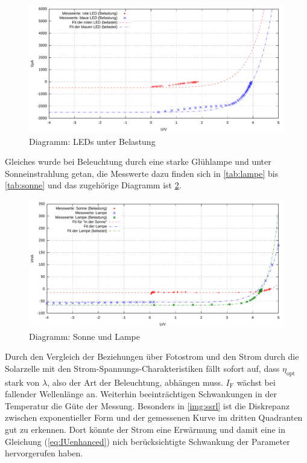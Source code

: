 \documentclass[numbers=noenddot,12pt,a4paper]{scrartcl}
\newcommand{\ix}[1]{_\text{#1}}
\begin{document}
\begin{figure}[H]
	\includegraphics[width=1\textwidth]{messwerte/stromspannungspannungsrichtigbelastungled.pdf}
	\vspace{-2em}
	\caption{Diagramm: LEDs unter Belastung} \label{img:ssrbl}
\end{figure}
Gleiches wurde bei Beleuchtung durch eine starke Glühlampe und unter Sonneinstrahlung getan, die Messwerte dazu finden sich in \ref{tab:lampe} bis \ref{tab:sonne} und das zugehörige Diagramm ist \ref{img:sslus}.
\begin{figure}[H]
	\includegraphics[width=1\textwidth]{messwerte/stromspannunglampeundsonne.pdf}
	\vspace{-2em}
	\caption{Diagramm: Sonne und Lampe} \label{img:sslus}
	\vspace{-1em}
\end{figure}
Durch den Vergleich der Beziehungen über Fotostrom und den Strom durch die Solarzelle mit den Strom-Spannungs-Charakteristiken fällt sofort auf, dass $\eta\ix{opt}$ stark von $\lambda$, also der Art der Beleuchtung, abhängen muss. $I\ix{F}$ wächst bei fallender Wellenlänge an. Weiterhin beeinträchtigen Schwankungen in der Temperatur die Güte der Messung. Besonders in \ref{img:ssrl} ist die Diskrepanz zwischen exponentieller Form und der gemessenen Kurve im dritten Quadranten gut zu erkennen. Dort könnte der Strom eine Erwärmung und damit eine in Gleichung (\ref{eq:IUenhanced}) nich berücksichtigte Schwankung der Parameter hervorgerufen haben.\\
\end{document}
